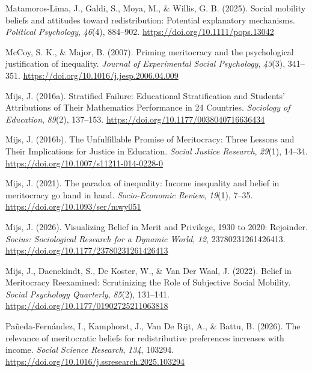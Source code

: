 \documentclass[
  13pt,
]{article}
\newlength{\cslhangindent}
\newenvironment{CSLReferences}[2] %
 {\begin{list}{}{%
  \setlength{\itemindent}{0pt}
  \setlength{\leftmargin}{0pt}
  \setlength{\parsep}{0pt}
  \ifodd #1
   \setlength{\leftmargin}{\cslhangindent}
   \setlength{\itemindent}{-1\cslhangindent}
  \fi
  \setlength{\itemsep}{#2\baselineskip}}}
 {\end{list}}
\begin{document}
\begin{CSLReferences}{1}{0}
Matamoros-Lima, J., Galdi, S., Moya, M., \& Willis, G. B. (2025). Social
mobility beliefs and attitudes toward redistribution: {Potential}
explanatory mechanisms. \emph{Political Psychology}, \emph{46}(4),
884--902. \url{https://doi.org/10.1111/pops.13042}

McCoy, S. K., \& Major, B. (2007). Priming meritocracy and the
psychological justification of inequality. \emph{Journal of Experimental
Social Psychology}, \emph{43}(3), 341--351.
\url{https://doi.org/10.1016/j.jesp.2006.04.009}

Mijs, J. (2016a). Stratified {Failure}: {Educational Stratification} and
{Students}' {Attributions} of {Their Mathematics Performance} in 24
{Countries}. \emph{Sociology of Education}, \emph{89}(2), 137--153.
\url{https://doi.org/10.1177/0038040716636434}

Mijs, J. (2016b). The {Unfulfillable Promise} of {Meritocracy}: {Three
Lessons} and {Their Implications} for {Justice} in {Education}.
\emph{Social Justice Research}, \emph{29}(1), 14--34.
\url{https://doi.org/10.1007/s11211-014-0228-0}

Mijs, J. (2021). The paradox of inequality: Income inequality and belief
in meritocracy go hand in hand. \emph{Socio-Economic Review},
\emph{19}(1), 7--35. \url{https://doi.org/10.1093/ser/mwy051}

Mijs, J. (2026). Visualizing {Belief} in {Merit} and {Privilege}, 1930
to 2020: {Rejoinder}. \emph{Socius: Sociological Research for a Dynamic
World}, \emph{12}, 23780231261426413.
\url{https://doi.org/10.1177/23780231261426413}

Mijs, J., Daenekindt, S., De Koster, W., \& Van Der Waal, J. (2022).
Belief in {Meritocracy Reexamined}: {Scrutinizing} the {Role} of
{Subjective Social Mobility}. \emph{Social Psychology Quarterly},
\emph{85}(2), 131--141. \url{https://doi.org/10.1177/01902725211063818}

Pañeda-Fernández, I., Kamphorst, J., Van De Rijt, A., \& Battu, B.
(2026). The relevance of meritocratic beliefs for redistributive
preferences increases with income. \emph{Social Science Research},
\emph{134}, 103294.
\url{https://doi.org/10.1016/j.ssresearch.2025.103294}


\end{CSLReferences}
\end{document}
